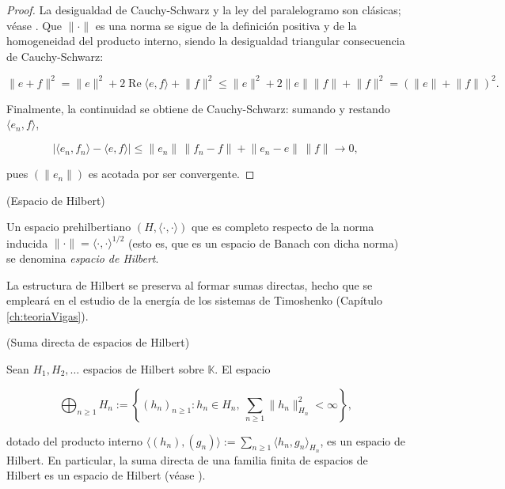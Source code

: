 \begin{proof}
La desigualdad de Cauchy-Schwarz y la ley del paralelogramo son clásicas; véase
\cite[I.1.4]{conway-1990-cou-fun-ana}. Que $\lVert \cdot \rVert$ es una norma se
sigue de la definición positiva y de la homogeneidad del producto interno, siendo
la desigualdad triangular consecuencia de Cauchy-Schwarz:

\[\lVert e + f \rVert^2 = \lVert e \rVert^2 + 2\operatorname{Re}\langle e, f \rangle + \lVert f \rVert^2 \leq \lVert e \rVert^2 + 2\lVert e \rVert \lVert f \rVert + \lVert f \rVert^2 = (\lVert e \rVert + \lVert f \rVert)^2.\]

Finalmente, la continuidad se obtiene de Cauchy-Schwarz: sumando y restando
$\langle e_n, f \rangle$,

\[|\langle e_n, f_n \rangle - \langle e, f \rangle| \leq \lVert e_n \rVert \, \lVert f_n - f \rVert + \lVert e_n - e \rVert \, \lVert f \rVert \rightarrow 0,\]

pues $(\lVert e_n \rVert)$ es acotada por ser convergente.
\end{proof}

\begin{Definicion}{(Espacio de Hilbert)}
\label{ch:preliminares:def:hilbert}

Un espacio prehilbertiano $(H, \langle \cdot, \cdot \rangle)$ que es completo
respecto de la norma inducida $\lVert \cdot \rVert = \langle \cdot, \cdot \rangle^{1/2}$
(esto es, que es un espacio de Banach con dicha norma) se denomina
\textit{espacio de Hilbert}.
\end{Definicion}

La estructura de Hilbert se preserva al formar sumas directas, hecho que se
empleará en el estudio de la energía de los sistemas de Timoshenko
(Capítulo \ref{ch:teoriaVigas}).\\

\begin{Proposicion}{(Suma directa de espacios de Hilbert)}
\label{ch:preliminares:prop:sumaDirecta}

Sean $H_1, H_2, \ldots$ espacios de Hilbert sobre $\mathbb{K}$. El espacio

\[\bigoplus_{n \geq 1} H_n := \left\{ (h_n)_{n \geq 1} : h_n \in H_n, \ \sum_{n \geq 1} \lVert h_n \rVert_{H_n}^2 < \infty \right\},\]

dotado del producto interno
$\langle (h_n), (g_n) \rangle := \sum_{n \geq 1} \langle h_n, g_n \rangle_{H_n}$,
es un espacio de Hilbert. En particular, la suma directa de una familia finita de
espacios de Hilbert es un espacio de Hilbert
(véase \cite[Proposición~I.6.2]{conway-1990-cou-fun-ana}).
\end{Proposicion}

